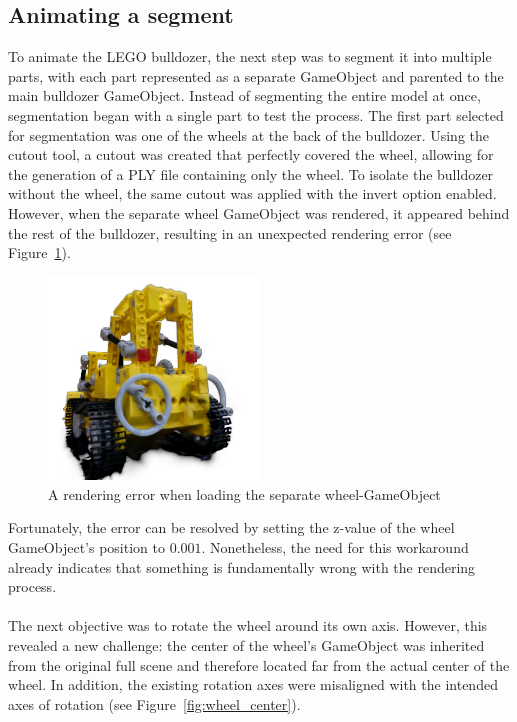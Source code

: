 \documentclass[12pt]{article}
\begin{document}
\subsection{Animating a segment}
To animate the LEGO bulldozer, the next step was to segment it into multiple parts, with each part represented as a separate GameObject and parented to the main bulldozer GameObject. Instead of segmenting the entire model at once, segmentation began with a single part to test the process. The first part selected for segmentation was one of the wheels at the back of the bulldozer. Using the cutout tool, a cutout was created that perfectly covered the wheel, allowing for the generation of a PLY file containing only the wheel. To isolate the bulldozer without the wheel, the same cutout was applied with the invert option enabled. However, when the separate wheel GameObject was rendered, it appeared behind the rest of the bulldozer, resulting in an unexpected rendering error (see Figure~\ref{fig:firstwheel}).
\begin{figure}[h!]
	\centering
	\includegraphics[width=0.5\textwidth]{Images/first_wheel.png}
	\caption{A rendering error when loading the separate wheel-GameObject}
	\label{fig:firstwheel}
\end{figure}
\FloatBarrier
\noindent
Fortunately, the error can be resolved by setting the z-value of the wheel GameObject’s position to $0.001$. Nonetheless, the need for this workaround already indicates that something is fundamentally wrong with the rendering process.
\\\\
The next objective was to rotate the wheel around its own axis. However, this revealed a new challenge: the center of the wheel’s GameObject was inherited from the original full scene and therefore located far from the actual center of the wheel. In addition, the existing rotation axes were misaligned with the intended axes of rotation (see Figure~\ref{fig:wheel_center}).
\end{document}
